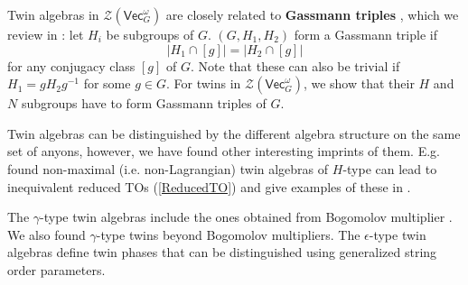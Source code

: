 \documentclass[aps,twocolumn,prx,floatfix,preprintnumbers, nofootinbib,10pt]{revtex4-2}
\numberwithin{equation}{section}
\theoremstyle{definition}
\newcommand{\be}{\begin{equation}}
\newcommand{\ee}{\end{equation}}
\newcommand{\cZ}{\mathcal{Z}}
\renewcommand{\Vec}{\mathsf{Vec}}
\newcommand{\eps}{\epsilon}
\begin{document}
Twin algebras in $\cZ(\Vec_G^\omega)$ are closely related to  {\bf Gassmann triples} \cite{Sunada1985RiemannianCA, Gassmann:1926}, which we  review  in : let $H_i$ be subgroups of $G$. 
$(G, H_1, H_2)$ form a Gassmann triple if 
\be 
|H_1 \cap [g]|=|H_2\cap [g]|
\ee
for any conjugacy class $[g]$ of $G$. Note that these can also be trivial if $H_1=gH_2g^{-1}$ for some $g\in G$.
For twins in $\cZ(\Vec_G^\omega)$, we show that their $H$ and $N$ subgroups have to form Gassmann triples of $G$. 


Twin algebras can be distinguished by the different algebra structure on the same set of anyons, however, we have found other interesting imprints of them. E.g.  found non-maximal (i.e. non-Lagrangian) twin algebras of $H$-type can lead to inequivalent reduced TOs (\ref{ReducedTO}) and give examples of these in .

The $\gamma$-type twin algebras include the ones obtained from Bogomolov multiplier \cite{Pollmann:2012, Davydov:2013xov, Kobayashi:2025ykb, Kobayashi:2025pxs}. We also found $\gamma$-type twins beyond Bogomolov multipliers. 
The $\eps$-type twin algebras define twin phases that can be distinguished using generalized string order parameters.
\end{document}
